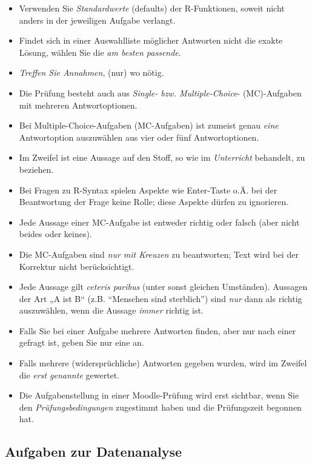 \documentclass[
  a4paper,
  DIV=11]{scrreprt}
\providecommand{\tightlist}{%
  \setlength{\itemsep}{0pt}\setlength{\parskip}{0pt}}\usepackage{longtable,booktabs,array}
\theoremstyle{definition}
\theoremstyle{remark}
\begin{document}
\begin{itemize}
\tightlist
\item
  Verwenden Sie \emph{Standardwerte} (defaults) der R-Funktionen, soweit
  nicht anders in der jeweiligen Aufgabe verlangt.
\item
  Findet sich in einer Auswahlliste möglicher Antworten nicht die exakte
  Lösung, wählen Sie die \emph{am besten passende}.
\item
  \emph{Treffen Sie Annahmen}, (nur) wo nötig.
\item
  Die Prüfung besteht auch aus \emph{Single- bzw. Multiple-Choice}-
  (MC)-Aufgaben mit mehreren Antwortoptionen.
\item
  Bei Multiple-Choice-Aufgaben (MC-Aufgaben) ist zumeist genau
  \emph{eine} Antwortoption auszuwählen aus vier oder fünf
  Antwortoptionen.
\item
  Im Zweifel ist eine Aussage auf den Stoff, so wie im \emph{Unterricht}
  behandelt, zu beziehen.
\item
  Bei Fragen zu R-Syntax spielen Aspekte wie Enter-Taste o.Ä. bei der
  Beantwortung der Frage keine Rolle; diese Aspekte dürfen zu
  ignorieren.
\item
  Jede Aussage einer MC-Aufgabe ist entweder richtig oder falsch (aber
  nicht beides oder keines).
\item
  Die MC-Aufgaben sind \emph{nur mit Kreuzen} zu beantworten; Text wird
  bei der Korrektur nicht berücksichtigt.
\item
  Jede Aussage gilt \emph{ceteris paribus} (unter sonst gleichen
  Umständen). Aussagen der Art „A ist B`` (z.B. ``Menschen sind
  sterblich'') sind \emph{nur} dann als richtig auszuwählen, wenn die
  Aussage \emph{immer} richtig ist.
\item
  Falls Sie bei einer Aufgabe mehrere Antworten finden, aber nur nach
  einer gefragt ist, geben Sie nur eine an.
\item
  Falls mehrere (widersprüchliche) Antworten gegeben wurden, wird im
  Zweifel die \emph{erst genannte} gewertet.
\item
  Die Aufgabenstellung in einer Moodle-Prüfung wird erst sichtbar, wenn
  Sie den \emph{Prüfungsbedingungen} zugestimmt haben und die
  Prüfungszeit begonnen hat.
\end{itemize}

\hypertarget{aufgaben-zur-datenanalyse}{%
\subsection{Aufgaben zur Datenanalyse}\label{aufgaben-zur-datenanalyse}}
\end{document}
